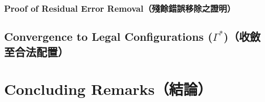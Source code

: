 \documentclass[a4paper, 12pt]{article}
\begin{document}
\subsubsection{Proof of Residual Error Removal（殘餘錯誤移除之證明）}
\label{subsub:proofclean}

\subsection{Convergence to Legal Configurations ($\Gamma^*$)（收斂至合法配置）}
\label{subsec:convergencelegal}

\section{Concluding Remarks（結論）}

% 
% 
\end{document}
